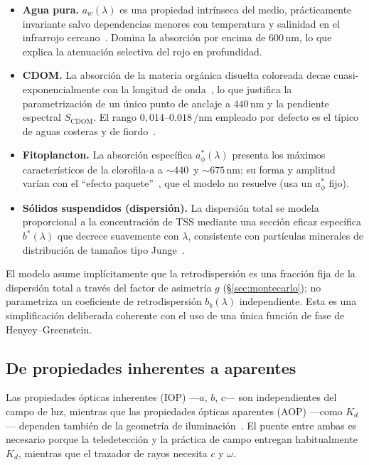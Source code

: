 \documentclass[11pt,a4paper]{article}
\newcommand{\SI}[2]{\ensuremath{#1\,#2}}
\newcommand{\meter}{\mathrm{m}}
\newcommand{\per}{/}
\newcommand{\nano}[1]{\mathrm{n}#1}
\begin{document}
\begin{itemize}[itemsep=3pt]
  \item \textbf{Agua pura.} $a_w(\lambda)$ es una propiedad intrínseca del medio,
  prácticamente invariante salvo dependencias menores con temperatura y salinidad
  en el infrarrojo cercano~\cite{popefry,smithbaker}. Domina la absorción por encima
  de \SI{600}{\nano\meter}, lo que explica la atenuación selectiva del rojo en
  profundidad.
  \item \textbf{CDOM.} La absorción de la materia orgánica disuelta coloreada decae
  cuasi-exponencialmente con la longitud de onda~\cite{bricaud_cdom,kirk}, lo que
  justifica la parametrización de un único punto de anclaje a \SI{440}{\nano\meter}
  y la pendiente espectral $S_\text{CDOM}$. El rango $0{,}014$--$\SI{0.018}{\per\nano\meter}$
  empleado por defecto es el típico de aguas costeras y de fiordo~\cite{bricaud_cdom}.
  \item \textbf{Fitoplancton.} La absorción específica $a_\phi^{*}(\lambda)$ presenta
  los máximos característicos de la clorofila-a a $\sim$\SI{440}{} y
  $\sim$\SI{675}{\nano\meter}; su forma y amplitud varían con el ``efecto
  paquete''~\cite{bricaud}, que el modelo no resuelve (usa un $a_\phi^{*}$ fijo).
  \item \textbf{Sólidos suspendidos (dispersión).} La dispersión total se modela
  proporcional a la concentración de TSS mediante una sección eficaz específica
  $b^{*}(\lambda)$ que decrece suavemente con $\lambda$, consistente con partículas
  minerales de distribución de tamaños tipo Junge~\cite{babin}.
\end{itemize}

El modelo asume implícitamente que la retrodispersión es una fracción fija de la
dispersión total a través del factor de asimetría $g$ (\S\ref{sec:montecarlo}); no
parametriza un coeficiente de retrodispersión $b_b(\lambda)$ independiente. Esta es
una simplificación deliberada coherente con el uso de una única función de fase de
Henyey--Greenstein.

\subsection{De propiedades inherentes a aparentes}

Las propiedades ópticas inherentes (IOP) —$a$, $b$, $c$— son independientes del
campo de luz, mientras que las propiedades ópticas aparentes (AOP) —como $K_d$—
dependen también de la geometría de iluminación~\cite{mobley,kirk}. El puente entre
ambas es necesario porque la teledetección y la práctica de campo entregan
habitualmente $K_d$, mientras que el trazador de rayos necesita $c$ y $\omega$.
\end{document}
